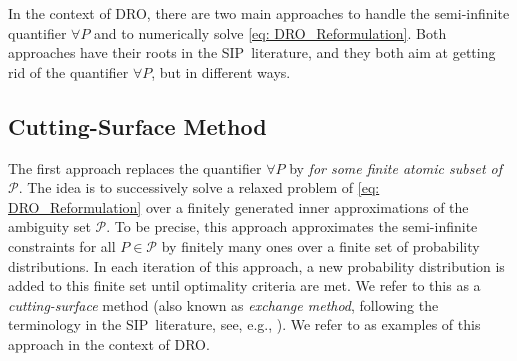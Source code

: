 \documentclass[final,onefignum,onetabnum]{class}
\newcommand{\Cs}[1]{\mathcal{#1}} %
\newcommand{\dro}{DRO}
\newcommand{\sip}{SIP}
\begin{document}
In the context of \dro, there are two main approaches to handle the  semi-infinite quantifier $\forall P$ and to numerically solve \eqref{eq: DRO_Reformulation}. Both approaches  have their roots in the  \sip\ literature, and they both aim at getting rid of the  quantifier $\forall P$, but in different ways. 

\subsection{Cutting-Surface Method}
The first approach replaces   the quantifier $\forall P$ by  {\it for some finite atomic subset of} $\Cs{P}$. The idea is to successively solve a relaxed problem of \eqref{eq: DRO_Reformulation}  over a finitely generated inner approximations of the ambiguity set $\Cs{P}$. To be precise, this approach approximates the semi-infinite constraints for all  $P \in \Cs{P}$ by finitely many ones over a finite set of probability distributions. In each iteration of this approach, a new probability distribution is added to this finite set until optimality criteria are met. We refer to this as a {\it cutting-surface} method (also known as  {\it exchange method}, following the terminology in the \sip\ literature, see, e.g., \citet{mehrotra2014semi,hettich1993}). We refer to  \citet{pflug2007,rahimian2019,bansal2018} as examples of this approach in the context of \dro.   
\end{document}
